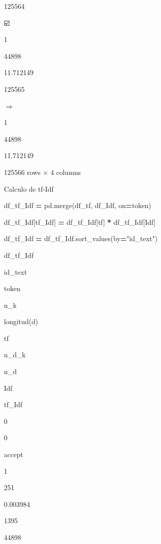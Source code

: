 \documentclass[
  11pt,
  a4paper,
]{article}
\newenvironment{Shaded}{\begin{snugshade}}{\end{snugshade}}
\newcommand{\NormalTok}[1]{#1}
\newcommand{\OperatorTok}[1]{\textcolor[rgb]{0.81,0.36,0.00}{\textbf{#1}}}
\newcommand{\StringTok}[1]{\textcolor[rgb]{0.31,0.60,0.02}{#1}}
\begin{document}
125564

☑️

1

44898

11.712149

125565

\(\Rightarrow\)

1

44898

11.712149

125566 rows × 4 columns

Calculo de tf-Idf

\begin{Shaded}
\begin{Highlighting}[]
\NormalTok{df\_tf\_Idf }\OperatorTok{=}\NormalTok{ pd.merge(df\_tf, df\_Idf, on}\OperatorTok{=}\StringTok{\textquotesingle{}token\textquotesingle{}}\NormalTok{)}

\NormalTok{df\_tf\_Idf[}\StringTok{\textquotesingle{}tf\_Idf\textquotesingle{}}\NormalTok{] }\OperatorTok{=}\NormalTok{ df\_tf\_Idf[}\StringTok{\textquotesingle{}tf\textquotesingle{}}\NormalTok{] }\OperatorTok{*}\NormalTok{ df\_tf\_Idf[}\StringTok{\textquotesingle{}Idf\textquotesingle{}}\NormalTok{] }

\NormalTok{df\_tf\_Idf }\OperatorTok{=}\NormalTok{ df\_tf\_Idf.sort\_values(by}\OperatorTok{=}\StringTok{"id\_text"}\NormalTok{)}
\end{Highlighting}
\end{Shaded}

\begin{Shaded}
\begin{Highlighting}[]
\NormalTok{df\_tf\_Idf}
\end{Highlighting}
\end{Shaded}

id\_text

token

n\_k

longitud(d)

tf

n\_d\_k

n\_d

Idf

tf\_Idf

0

0

accept

1

251

0.003984

1395

44898
\end{document}
